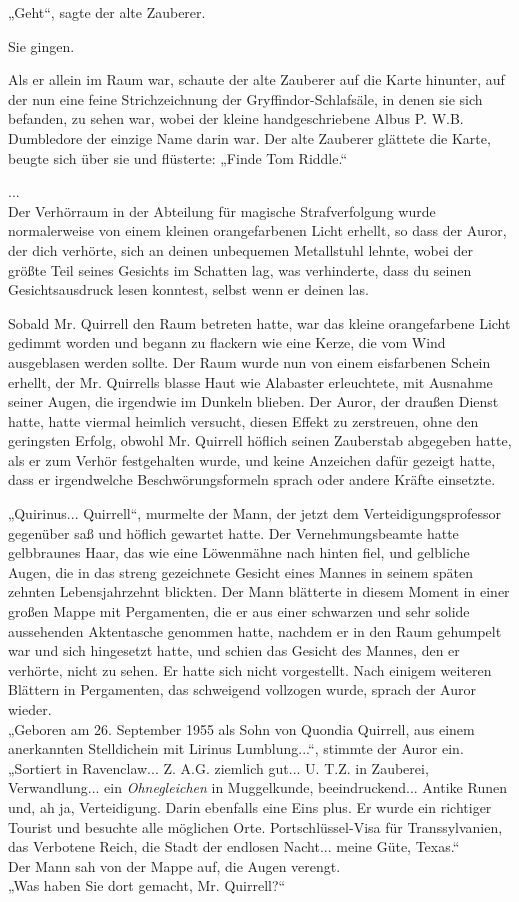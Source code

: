 {„Geht“, sagte der alte Zauberer.

Sie gingen.

Als er allein im Raum war, schaute der alte Zauberer auf die Karte hinunter, auf der nun eine feine Strichzeichnung der Gryffindor-Schlafsäle, in denen sie sich befanden, zu sehen war, wobei der kleine handgeschriebene Albus P. W.B. Dumbledore der einzige Name darin war. Der alte Zauberer glättete die Karte, beugte sich über sie und flüsterte: „Finde Tom Riddle.“

...\\ Der Verhörraum in der Abteilung für magische Strafverfolgung wurde normalerweise von einem kleinen orangefarbenen Licht erhellt, so dass der Auror, der dich verhörte, sich an deinen unbequemen Metallstuhl lehnte, wobei der größte Teil seines Gesichts im Schatten lag, was verhinderte, dass du seinen Gesichtsausdruck lesen konntest, selbst wenn er deinen las.

Sobald Mr. Quirrell den Raum betreten hatte, war das kleine orangefarbene Licht gedimmt worden und begann zu flackern wie eine Kerze, die vom Wind ausgeblasen werden sollte. Der Raum wurde nun von einem eisfarbenen Schein erhellt, der Mr. Quirrells blasse Haut wie Alabaster erleuchtete, mit Ausnahme seiner Augen, die irgendwie im Dunkeln blieben. Der Auror, der draußen Dienst hatte, hatte viermal heimlich versucht, diesen Effekt zu zerstreuen, ohne den geringsten Erfolg, obwohl Mr. Quirrell höflich seinen Zauberstab abgegeben hatte, als er zum Verhör festgehalten wurde, und keine Anzeichen dafür gezeigt hatte, dass er irgendwelche Beschwörungsformeln sprach oder andere Kräfte einsetzte.

„Quirinus... Quirrell“, murmelte der Mann, der jetzt dem Verteidigungsprofessor gegenüber saß und höflich gewartet hatte. Der Vernehmungsbeamte hatte gelbbraunes Haar, das wie eine Löwenmähne nach hinten fiel, und gelbliche Augen, die in das streng gezeichnete Gesicht eines Mannes in seinem späten zehnten Lebensjahrzehnt blickten. Der Mann blätterte in diesem Moment in einer großen Mappe mit Pergamenten, die er aus einer schwarzen und sehr solide aussehenden Aktentasche genommen hatte, nachdem er in den Raum gehumpelt war und sich hingesetzt hatte, und schien das Gesicht des Mannes, den er verhörte, nicht zu sehen. Er hatte sich nicht vorgestellt. Nach einigem weiteren Blättern in Pergamenten, das schweigend vollzogen wurde, sprach der Auror wieder.\\ „Geboren am 26. September 1955 als Sohn von Quondia Quirrell, aus einem anerkannten Stelldichein mit Lirinus Lumblung...“, stimmte der Auror ein. „Sortiert in Ravenclaw... Z. A.G. ziemlich gut... U. T.Z. in Zauberei, Verwandlung... ein \emph{Ohnegleichen} in Muggelkunde, beeindruckend... Antike Runen und, ah ja, Verteidigung. Darin ebenfalls eine Eins plus. Er wurde ein richtiger Tourist und besuchte alle möglichen Orte. Portschlüssel-Visa für Transsylvanien, das Verbotene Reich, die Stadt der endlosen Nacht... meine Güte, Texas.“\\ Der Mann sah von der Mappe auf, die Augen verengt.\\ „Was haben Sie dort gemacht, Mr. Quirrell?“

}
